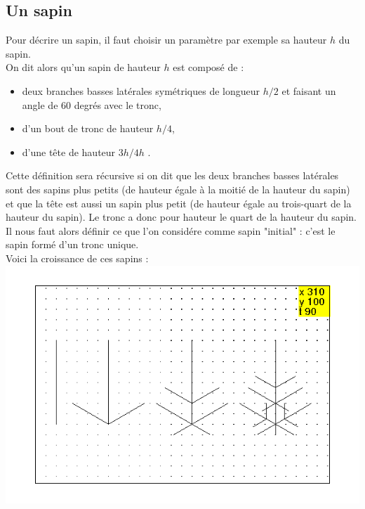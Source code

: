 \documentclass[a4paper,11pt]{book}
\begin{document}
\subsection{Un sapin}
Pour d\'ecrire un sapin, il faut choisir un param\`etre par exemple sa hauteur 
$h$ du sapin.\\ 
On dit alors qu'un sapin de hauteur $h$ est compos\'e de :
\begin{itemize}
\item deux branches basses lat\'erales sym\'etriques de longueur $h/2$ et 
faisant un angle de 60 degr\'es avec le tronc,
\item d'un bout de tronc de hauteur $h/4$,
\item d'une t\^ete de hauteur $3h/4h$ .
\end{itemize}
Cette d\'efinition sera r\'ecursive si on dit que les deux branches basses 
lat\'erales sont des sapins plus petits (de hauteur \'egale \`a la  moiti\'e de
 la hauteur du sapin) et que la t\^ete est aussi un  sapin plus petit 
(de hauteur \'egale au trois-quart de la hauteur du sapin). Le tronc a donc 
pour hauteur le quart de  la hauteur du 
sapin. Il nous faut alors d\'efinir ce que l'on consid\'ere 
comme sapin "initial" : c'est le sapin form\'e d'un tronc unique. \\ 
Voici la croissance de ces sapins :\\

%
\includegraphics[width=\textwidth]{tortsap}\\
\end{document}
